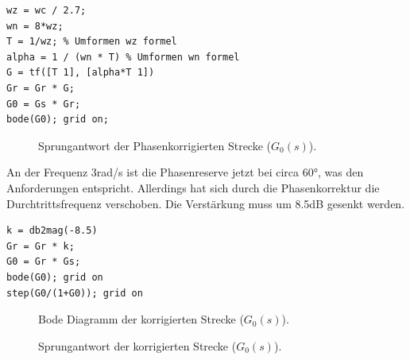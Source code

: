 \documentclass[11pt,a4paper]{article}
\newlength\figureheight
\newlength\figurewidth
\begin{document}
\begin{lstlisting}
wz = wc / 2.7;
wn = 8*wz;
T = 1/wz; % Umformen wz formel
alpha = 1 / (wn * T) % Umformen wn formel
G = tf([T 1], [alpha*T 1])
Gr = Gr * G;
G0 = Gs * Gr;
bode(G0); grid on;
\end{lstlisting}

\begin{figure}[H]
    \centering
    \setlength\figureheight{6cm}
    \setlength{} %
    
    
    
    \caption{Sprungantwort der Phasenkorrigierten Strecke ($G_{\mathrm{0}}(s)$).}
    \label{fig:matlab_plot11}
\end{figure}

\noindent An der Frequenz 3rad/s ist die Phasenreserve jetzt bei circa 60°, was den Anforderungen entspricht. Allerdings hat sich durch die Phasenkorrektur die Durchtrittsfrequenz verschoben. Die Verstärkung muss um 8.5dB gesenkt werden.

\begin{lstlisting}
k = db2mag(-8.5)
Gr = Gr * k;
G0 = Gr * Gs;
bode(G0); grid on
step(G0/(1+G0)); grid on
\end{lstlisting}

\begin{figure}[H]
    \centering
    \setlength\figureheight{6cm}
    \setlength{} %
    
    
    
    \caption{Bode Diagramm der korrigierten Strecke ($G_{\mathrm{0}}(s)$).}
    \label{fig:matlab_plot12}
\end{figure}

\begin{figure}[H]
    \centering
    \setlength\figureheight{6cm}
    \setlength{} %
    
    
    
    \caption{Sprungantwort der korrigierten Strecke ($G_{\mathrm{0}}(s)$).}
    \label{fig:matlab_plot13}
\end{figure}
\end{document}
